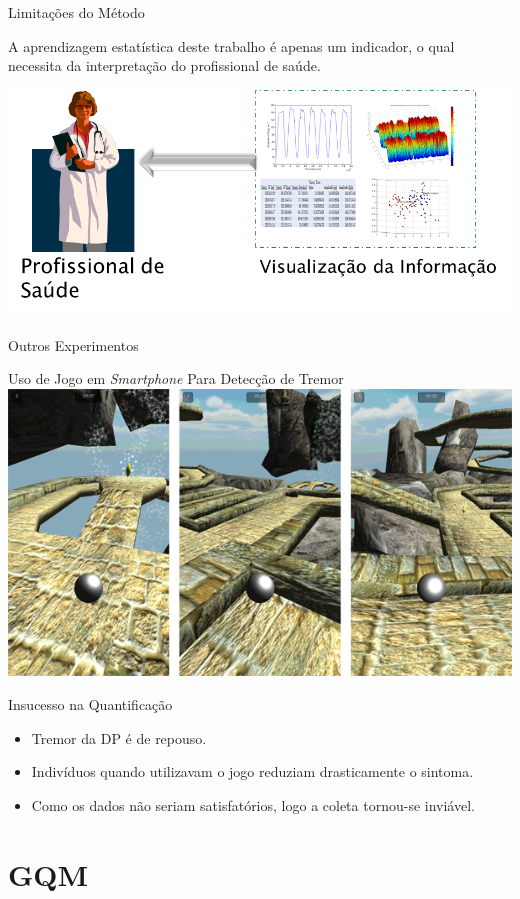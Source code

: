 \documentclass{beamer}
\begin{document}
\begin{frame}{Limitações do Método}
	\begin{block}{}
	A aprendizagem estatística deste trabalho é apenas um indicador, o qual necessita da interpretação do profissional de saúde.
	\end{block}
  \begin{block}{}
      \center \includegraphics[height=1 in]{img/visualizacaomedico.png}
  \end{block}
\end{frame}

\begin{frame}{Outros Experimentos}
	\begin{block}{Uso de Jogo em \textit{Smartphone} Para Detecção de Tremor}
	\center \includegraphics[height=1 in]{img/pinball_world.png}
	\end{block}
	\begin{block}{Insucesso na Quantificação}
			\begin{itemize}[<+->]
			\item Tremor da DP é de repouso.
			\item Indivíduos quando utilizavam o jogo reduziam drasticamente o sintoma.
			\item Como os dados não seriam satisfatórios, logo a coleta tornou-se inviável.
		\end{itemize}
	\end{block}
\end{frame}






\section{GQM}
\end{document}
